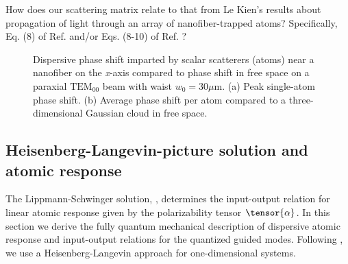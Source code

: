 \documentclass[preprint,aps,pra,onecolumn]{revtex4-1} %
\newcommand{\comment}[1]{{\color{Maroon} #1}}
\begin{document}
\comment{How does our scattering matrix relate to that from Le Kien's results about propagation of light through an array of nanofiber-trapped atoms?  Specifically, Eq. (8) of Ref. \cite{le_kien_correlations_2008} and/or Eqs. (8-10) of Ref. \cite{le_kien_propagation_2014}?  
}
\begin{figure}
\begin{minipage}{.49\linewidth}
\centering
{}
\end{minipage}
\caption{Dispersive phase shift imparted by scalar scatterers (atoms) near a nanofiber on the \emph{x}-axis compared to phase shift in free space on a paraxial $\mathrm{TEM}_{00}$ beam with waist $w_0 = 30 \mu$m. (a) Peak single-atom phase shift. (b) Average phase shift per atom compared to a three-dimensional Gaussian cloud in free space. }\label{Fig::PhaseShift}
\end{figure}

	
	\subsection{Heisenberg-Langevin-picture solution and atomic response}
	
The Lippmann-Schwinger solution, , determines the input-output relation for linear atomic response given by the polarizability tensor $\tensor{\alpha}$.  In this section we derive the fully quantum mechanical description of dispersive atomic response and input-output relations for the quantized guided modes.  Following \cite{le_kien_spontaneous_2005}, we use a Heisenberg-Langevin approach for one-dimensional systems.  
\end{document}
